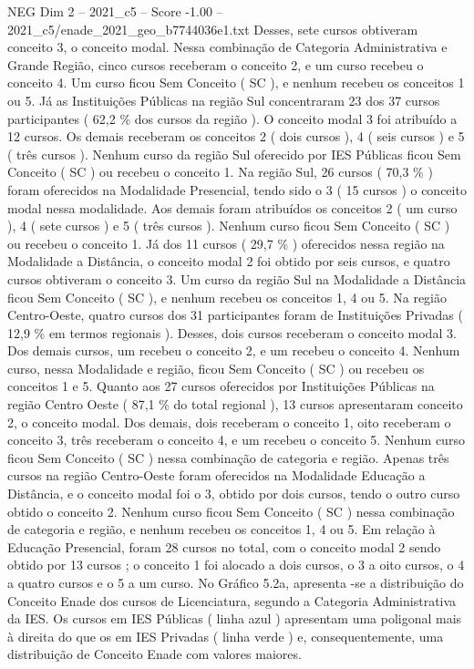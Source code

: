 \begin{textsample}{NEG Dim 2 – 2021\_c5 – Score -1.00 – 2021\_c5/enade\_2021\_geo\_b7744036e1.txt}
Desses, sete cursos obtiveram conceito 3, o conceito modal.
Nessa combinação de Categoria Administrativa e Grande Região, cinco cursos receberam o conceito 2, e um curso recebeu o conceito 4.
Um curso ficou Sem Conceito ( SC ), e nenhum recebeu os conceitos 1 ou 5.
Já as Instituições Públicas na região Sul concentraram 23 dos 37 cursos participantes ( 62,2 \% dos cursos da região ).
O conceito modal 3 foi atribuído a 12 cursos.
Os demais receberam os conceitos 2 ( dois cursos ), 4 ( seis cursos ) e 5 ( três cursos ).
Nenhum curso da região Sul oferecido por IES Públicas ficou Sem Conceito ( SC ) ou recebeu o conceito 1.
Na região Sul, 26 cursos ( 70,3 \% ) foram oferecidos na Modalidade Presencial, tendo sido o 3 ( 15 cursos ) o conceito modal nessa modalidade.
Aos demais foram atribuídos os conceitos 2 ( um curso ), 4 ( sete cursos ) e 5 ( três cursos ).
Nenhum curso ficou Sem Conceito ( SC ) ou recebeu o conceito 1.
Já dos 11 cursos ( 29,7 \% ) oferecidos nessa região na Modalidade a Distância, o conceito modal 2 foi obtido por seis cursos, e quatro cursos obtiveram o conceito 3.
Um curso da região Sul na Modalidade a Distância ficou Sem Conceito ( SC ), e nenhum recebeu os conceitos 1, 4 ou 5.
Na região Centro-Oeste, quatro cursos dos 31 participantes foram de Instituições Privadas ( 12,9 \% em termos regionais ).
Desses, dois cursos receberam o conceito modal 3.
Dos demais cursos, um recebeu o conceito 2, e um recebeu o conceito 4.
Nenhum curso, nessa Modalidade e região, ficou Sem Conceito ( SC ) ou recebeu os conceitos 1 e 5.
Quanto aos 27 cursos oferecidos por Instituições Públicas na região Centro Oeste ( 87,1 \% do total regional ), 13 cursos apresentaram conceito 2, o conceito modal.
Dos demais, dois receberam o conceito 1, oito receberam o conceito 3, três receberam o conceito 4, e um recebeu o conceito 5.
Nenhum curso ficou Sem Conceito ( SC ) nessa combinação de categoria e região.
Apenas três cursos na região Centro-Oeste foram oferecidos na Modalidade Educação a Distância, e o conceito modal foi o 3, obtido por dois cursos, tendo o outro curso obtido o conceito 2.
Nenhum curso ficou Sem Conceito ( SC ) nessa combinação de categoria e região, e nenhum recebeu os conceitos 1, 4 ou 5.
Em relação à Educação Presencial, foram 28 cursos no total, com o conceito modal 2 sendo obtido por 13 cursos ; o conceito 1 foi alocado a dois cursos, o 3 a oito cursos, o 4 a quatro cursos e o 5 a um curso.
No Gráfico 5.2a, apresenta -se a distribuição do Conceito Enade dos cursos de Licenciatura, segundo a Categoria Administrativa da IES.
Os cursos em IES Públicas ( linha azul ) apresentam uma poligonal mais à direita do que os em IES Privadas ( linha verde ) e, consequentemente, uma distribuição de Conceito Enade com valores maiores.

\end{textsample}
